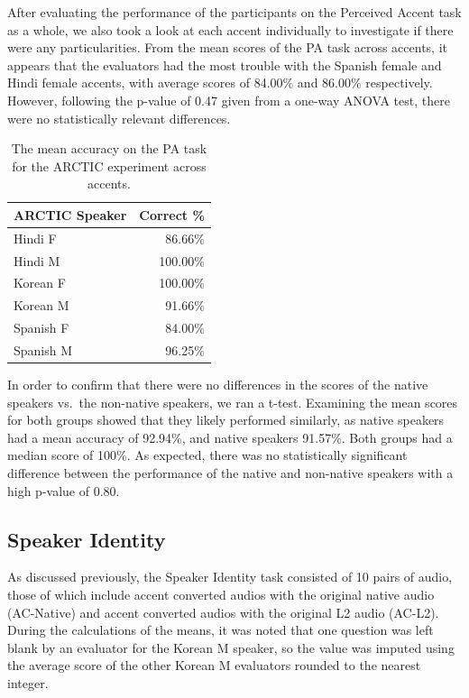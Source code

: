 \documentclass
[
    a4paper,
    twoside,
    12pt,
]
{report}
\begin{document}
After evaluating the performance of the participants on the Perceived
Accent task as a whole, we also took a look at each accent individually
to investigate if there were any particularities. From the mean scores
of the PA task across accents, it appears that the evaluators had the
most trouble with the Spanish female and Hindi female accents, with
average scores of 84.00\% and 86.00\% respectively. However, following
the p-value of 0.47 given from a one-way ANOVA test, there were no
statistically relevant differences.

\begin{table}[]
\centering
\begin{tabular}{|l|r|}
\hline
\textbf{ARCTIC Speaker} & \textbf{Correct \%} \\ \hline
Hindi F                  & 86.66\%             \\ \hline
Hindi M                  & 100.00\%             \\ \hline
Korean F                 & 100.00\%            \\ \hline
Korean M                 & 91.66\%            \\ \hline
Spanish F                & 84.00\%             \\ \hline
Spanish M                & 96.25\%             \\ \hline
\end{tabular}
\caption{The mean accuracy on the PA task for the ARCTIC experiment across accents.}
\label{table:pa-mean-per-accent}
\end{table}

In order to confirm that there were no differences in the scores of the
native speakers vs.~the non-native speakers, we ran a t-test. Examining
the mean scores for both groups showed that they likely performed
similarly, as native speakers had a mean accuracy of 92.94\%, and native
speakers 91.57\%. Both groups had a median score of 100\%. As expected,
there was no statistically significant difference between the
performance of the native and non-native speakers with a high p-value of
0.80.

\hypertarget{speaker-identity}{%
\subsection{Speaker Identity}\label{speaker-identity}}

As discussed previously, the Speaker Identity task consisted of 10 pairs
of audio, those of which include accent converted audios with the
original native audio (AC-Native) and accent converted audios with the
original L2 audio (AC-L2). During the calculations of the means, it was
noted that one question was left blank by an evaluator for the Korean M
speaker, so the value was imputed using the average score of the other
Korean M evaluators rounded to the nearest integer.
\end{document}
